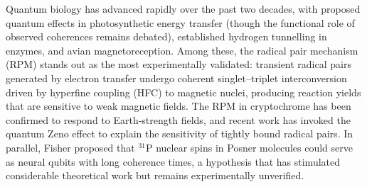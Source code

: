 \documentclass[11pt]{article}
\begin{document}
\vspace{1em}
 

Quantum biology has advanced rapidly over the past two decades, with proposed quantum effects in photosynthetic energy transfer\cite{Engel2007,Lambert2013} (though the functional role of observed coherences remains debated), established hydrogen tunnelling in enzymes\cite{Klinman2013}, and avian magnetoreception\cite{Ritz2000,Maeda2012,Xu2021}. Among these, the radical pair mechanism (RPM) stands out as the most experimentally validated: transient radical pairs generated by electron transfer undergo coherent singlet--triplet interconversion driven by hyperfine coupling (HFC) to magnetic nuclei, producing reaction yields that are sensitive to weak magnetic fields\cite{Hore2016,Steiner1989}. The RPM in cryptochrome has been confirmed to respond to Earth-strength fields\cite{Xu2021,Kattnig2016}, and recent work has invoked the quantum Zeno effect to explain the sensitivity of tightly bound radical pairs\cite{Kattnig2024}. In parallel, Fisher proposed that $^{31}$P nuclear spins in Posner molecules could serve as neural qubits with long coherence times\cite{Fisher2015}, a hypothesis that has stimulated considerable theoretical work\cite{Swift2018} but remains experimentally unverified.
\end{document}
